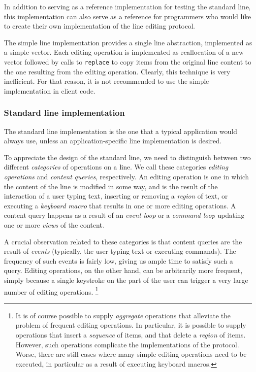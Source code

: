 In addition to serving as a reference implementation for testing the
standard line, this implementation can also serve as a reference for
programmers who would like to create their own implementation of the
line editing protocol.

The simple line implementation provides a single line abstraction,
implemented as a \commonlisp{} simple vector.  Each editing operation
is implemented as reallocation of a new vector followed by calls to
\texttt{replace} to copy items from the original line content to the
one resulting from the editing operation.  Clearly, this technique is
very inefficient.  For that reason, it is not recommended to use the
simple implementation in client code.

\subsubsection{Standard line implementation}

The standard line implementation is the one that a typical application
would always use, unless an application-specific line implementation
is desired.

To appreciate the design of the standard line, we need to distinguish
between two different \emph{categories} of operations on a line.  We
call these categories \emph{editing operations} and \emph{content
  queries}, respectively.  An editing operation is one in which the
content of the line is modified in some way, and is the result of the
interaction of a user typing text, inserting or removing a
\emph{region} of text, or executing a \emph{keyboard macro} that
results in one or more editing operations.  A content query happens
as a result of an \emph{event loop} or a \emph{command loop} updating
one or more \emph{views} of the content.

A crucial observation related to these categories is that content
queries are the result of \emph{events} (typically, the user typing
text or executing commands).  The frequency of such events is fairly
low, giving us ample time to satisfy such a query.  Editing
operations, on the other hand, can be arbitrarily more frequent,
simply because a single keystroke on the part of the user can trigger
a very large number of editing operations.%
\footnote{It is of course possible to supply \emph{aggregate}
  operations that alleviate the problem of frequent editing
  operations.  In particular, it is possible to supply operations that
  insert a \emph{sequence} of items, and that delete a \emph{region}
  of items.  However, such operations complicate the implementations
  of the protocol.  Worse, there are still cases where many simple
  editing operations need to be executed, in particular as a result of
  executing keyboard macros.}

